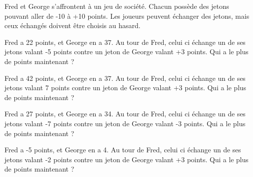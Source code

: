  Fred et George s'affrontent à un jeu de société. Chacun possède des jetons pouvant aller de -10 à +10 points. Les joueurs peuvent échanger des jetons, mais ceux échangés doivent être choisis au hasard.

\vspace*{-1em}

\begin{minipage}[t]{0.45\textwidth}
    
    Fred a 22 points, et George en a 37. Au tour de Fred, celui ci échange un de ses jetons valant -5 points contre un jeton de George valant +3 points. Qui a le plus de points maintenant ? 
\end{minipage}
\hfil
\vrule
\hfil
\begin{minipage}[t]{0.45\textwidth}
    
    Fred a 42 points, et George en a 37. Au tour de Fred, celui ci échange un de ses jetons valant 7 points contre un jeton de George valant +3 points. Qui a le plus de points maintenant ? 
\end{minipage}

\begin{minipage}[t]{0.45\textwidth}
    
    Fred a 27 points, et George en a 34. Au tour de Fred, celui ci échange un de ses jetons valant -7 points contre un jeton de George valant -3 points. Qui a le plus de points maintenant ? 
\end{minipage}
\hfil
\vrule
\hfil
\begin{minipage}[t]{0.45\textwidth}
    
    Fred a -5 points, et George en a 4. Au tour de Fred, celui ci échange un de ses jetons valant -2 points contre un jeton de George valant +3 points. Qui a le plus de points maintenant ? 
\end{minipage}